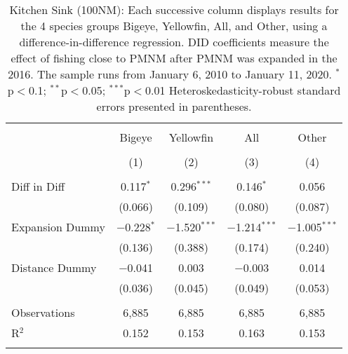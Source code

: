 
\begin{table}[!htbp] \centering 
  \caption{Kitchen Sink (100NM): Each successive column displays results for the 4 species groups Bigeye, Yellowfin, All, and Other, using a difference-in-difference regression. DID coefficients measure the effect of fishing close to PMNM after PMNM was expanded in the 2016. The sample runs from January 6, 2010 to January 11, 2020. $^{*}$p$<$0.1; $^{**}$p$<$0.05; $^{***}$p$<$0.01 Heteroskedasticity-robust standard errors presented in parentheses.} 
  \label{tbl:kitchenFE100NM} 
\begin{tabular}{@{\extracolsep{5pt}}lcccc} 
\\[-1.8ex]\hline 
\hline \\[-1.8ex] 
 & Bigeye & Yellowfin & All & Other \\ 
\\[-1.8ex] & (1) & (2) & (3) & (4)\\ 
\hline \\[-1.8ex] 
 Diff in Diff & 0.117$^{*}$ & 0.296$^{***}$ & 0.146$^{*}$ & 0.056 \\ 
  & (0.066) & (0.109) & (0.080) & (0.087) \\ 
  Expansion Dummy & $-$0.228$^{*}$ & $-$1.520$^{***}$ & $-$1.214$^{***}$ & $-$1.005$^{***}$ \\ 
  & (0.136) & (0.388) & (0.174) & (0.240) \\ 
  Distance Dummy & $-$0.041 & 0.003 & $-$0.003 & 0.014 \\ 
  & (0.036) & (0.045) & (0.049) & (0.053) \\ 
 \hline \\[-1.8ex] 
Observations & 6,885 & 6,885 & 6,885 & 6,885 \\ 
R$^{2}$ & 0.152 & 0.153 & 0.163 & 0.153 \\ 
\hline 
\hline \\[-1.8ex] 
\end{tabular} 
\end{table} 
